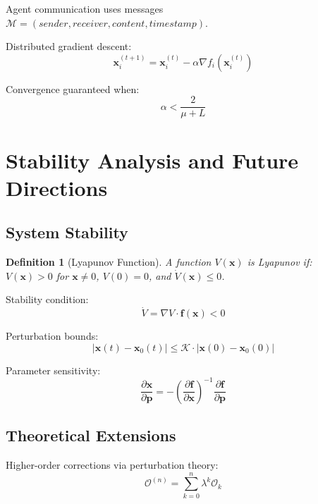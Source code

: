 \documentclass[12pt]{article}
\newtheorem{definition}[theorem]{Definition}
\begin{document}
Agent communication uses messages $\mathcal{M} = (sender, receiver, content, timestamp)$.

Distributed gradient descent:
\begin{equation}
\mathbf{x}_{i}^{(t+1)} = \mathbf{x}_{i}^{(t)} - \alpha \nabla f_i(\mathbf{x}_{i}^{(t)})
\end{equation}

Convergence guaranteed when:
\begin{equation}
\alpha < \frac{2}{\mu + L}
\end{equation}

\section{Stability Analysis and Future Directions}

\subsection{System Stability}

\begin{definition}[Lyapunov Function]
A function $V(\mathbf{x})$ is Lyapunov if:
$V(\mathbf{x}) > 0$ for $\mathbf{x} \neq 0$, $V(0) = 0$, and $\dot{V}(\mathbf{x}) \leq 0$.
\end{definition}

Stability condition:
\begin{equation}
\dot{V} = \nabla V \cdot \mathbf{f}(\mathbf{x}) < 0
\end{equation}

Perturbation bounds:
\begin{equation}
|\mathbf{x}(t) - \mathbf{x}_0(t)| \leq \mathcal{K} \cdot |\mathbf{x}(0) - \mathbf{x}_0(0)|
\end{equation}

Parameter sensitivity:
\begin{equation}
\frac{\partial \mathbf{x}}{\partial \mathbf{p}} = -\left(\frac{\partial \mathbf{f}}{\partial \mathbf{x}}\right)^{-1} \frac{\partial \mathbf{f}}{\partial \mathbf{p}}
\end{equation}

\subsection{Theoretical Extensions}

Higher-order corrections via perturbation theory:
\begin{equation}
\mathcal{O}^{(n)} = \sum_{k=0}^{n} \lambda^k \mathcal{O}_k
\end{equation}
\end{document}
